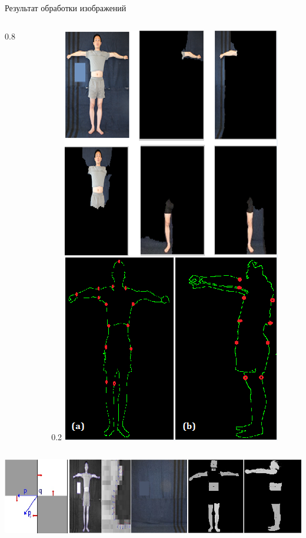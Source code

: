\documentclass[10pt,pdf,hyperref={unicode},xcolor=table]{beamer}
\begin{document}
\begin{frame}{Результат обработки изображений}
\begin{columns}
\begin{column} {0.8\textwidth}
\begin{table}[b!]
\begin{tabular}{|c|c|c|c|c|}
\hline
  \end{tabular}
\end{table}
		\end{column}
			\begin{column} {0.2\textwidth}	
			\includegraphics[width=1\linewidth]{p9}
					\end{column}      
		\end{columns}	
		
		\begin{center}
		\includegraphics[width=0.7\linewidth]{p8}
		\end{center}
		
\end{frame}
\end{document}
